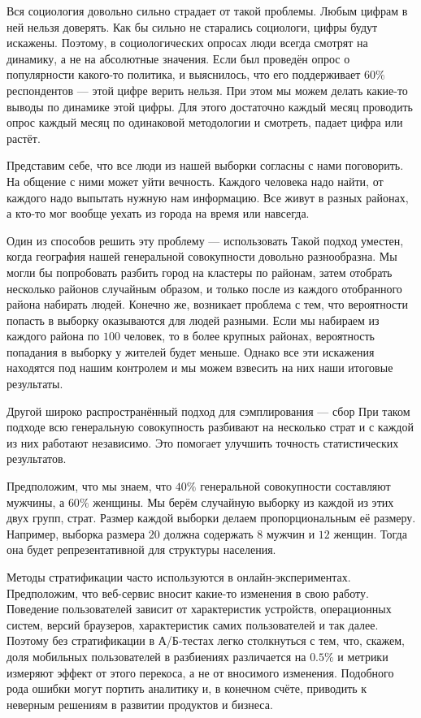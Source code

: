 \documentclass[12pt, a4paper, oneside]{article}
\begin{document}
Вся социология довольно сильно страдает от такой проблемы. Любым цифрам в ней нельзя доверять. Как бы сильно не старались социологи, цифры будут искажены. Поэтому, в социологических опросах люди всегда смотрят на динамику, а не на абсолютные значения. Если был проведён опрос о популярности какого-то политика, и выяснилось, что его поддерживает $60\%$ респондентов --- этой цифре верить нельзя. При этом мы можем делать какие-то выводы по динамике этой цифры. Для этого достаточно каждый месяц проводить опрос каждый месяц по одинаковой методологии и смотреть, падает цифра или растёт. 

Представим себе, что все люди из нашей выборки согласны с нами поговорить. На общение с ними может уйти вечность.  Каждого человека надо найти, от каждого надо выпытать нужную нам информацию. Все живут в разных районах, а кто-то мог вообще уехать из города на время или навсегда. 

Один из способов решить эту проблему --- использовать  Такой подход уместен, когда география нашей генеральной совокупности довольно разнообразна. Мы могли бы попробовать разбить город на кластеры по районам, затем отобрать несколько районов случайным образом, и только после из каждого отобранного района набирать людей. Конечно же, возникает проблема с тем, что вероятности попасть в выборку оказываются для людей разными. Если мы набираем из каждого района по $100$ человек, то в более крупных районах, вероятность попадания в выборку у жителей будет меньше. Однако все эти искажения находятся под нашим контролем и мы можем взвесить на них наши итоговые результаты. 

Другой широко распространённый подход для сэмплирования --- сбор  При таком подходе всю генеральную совокупность разбивают на несколько страт и с каждой из них работают независимо. Это помогает улучшить точность статистических результатов.  

Предположим, что мы знаем, что $40\%$ генеральной совокупности составляют мужчины, а $60\%$ женщины. Мы берём случайную выборку из каждой из этих двух групп, страт. Размер каждой выборки делаем пропорциональным её размеру. Например, выборка размера $20$ должна содержать $8$ мужчин и $12$ женщин. Тогда она будет репрезентативной для структуры населения.

Методы стратификации часто используются в онлайн-экспериментах. Предположим, что веб-сервис вносит какие-то изменения в свою работу. Поведение пользователей зависит от характеристик устройств, операционных систем, версий браузеров, характеристик самих пользователей и так далее. Поэтому без стратификации в А/Б-тестах легко столкнуться с тем, что, скажем, доля мобильных пользователей в разбиениях различается на $0.5\%$ и метрики измеряют эффект от этого перекоса, а не от вносимого изменения. Подобного рода ошибки могут портить аналитику и, в конечном счёте, приводить к неверным решениям в развитии продуктов и бизнеса.
\end{document}
